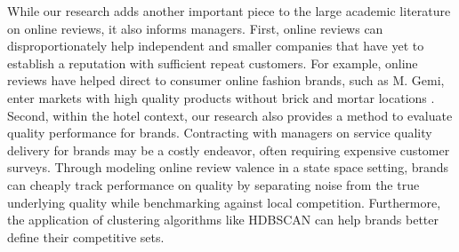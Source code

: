 \documentclass[mksc,blindrev]{informs3} %
\begin{document}
While our research adds another important piece to the large academic literature on online reviews, it also informs managers. First, online reviews can disproportionately help independent and smaller companies that have yet to establish a reputation with sufficient repeat customers. For example, online reviews have helped direct to consumer online fashion brands, such as M. Gemi, enter markets with high quality products without brick and mortar locations . Second, within the hotel context, our research also provides a method to evaluate quality performance for brands. Contracting with managers on service quality delivery for brands may be a costly endeavor, often requiring expensive customer surveys. Through modeling online review valence in a state space setting, brands can cheaply track performance on quality by separating noise from the true underlying quality while benchmarking against local competition. Furthermore, the application of clustering algorithms like HDBSCAN can help brands better define their competitive sets. 
\end{document}
